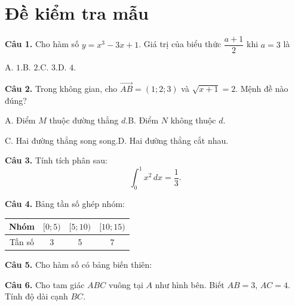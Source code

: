 \documentclass[12pt,a4paper]{article}
\newcommand{\vecto}[1]{\overrightarrow{#1}}
\begin{document}
\section*{Đề kiểm tra mẫu}

\textbf{Câu 1.} Cho hàm số $y=x^3-3x+1$. Giá trị của biểu thức $\dfrac{a+1}{2}$ khi $a=3$ là

\noindent A. $1$.\hfill B. $2$.\hfill C. $3$.\hfill D. $4$.

\textbf{Câu 2.} Trong không gian, cho $\vecto{AB}=(1;2;3)$ và $\sqrt{x+1}=2$. Mệnh đề nào đúng?

\noindent A. Điểm $M$ thuộc đường thẳng $d$.\hfill B. Điểm $N$ không thuộc $d$.

\noindent C. Hai đường thẳng song song.\hfill D. Hai đường thẳng cắt nhau.

\textbf{Câu 3.} Tính tích phân sau:
\begin{equation}
\int_0^1 x^2\,dx=\frac{1}{3}.
\end{equation}

\textbf{Câu 4.} Bảng tần số ghép nhóm:
\begin{center}
\begin{tabular}{|c|c|c|c|}
\hline
Nhóm & $[0;5)$ & $[5;10)$ & $[10;15)$ \\ \hline
Tần số & 3 & 5 & 7 \\ \hline
\end{tabular}
\end{center}

\textbf{Câu 5.} Cho hàm số có bảng biến thiên:
\begin{center}
\end{center}

\noindent\begin{minipage}{0.6\textwidth}
\textbf{Câu 6.} Cho tam giác $ABC$ vuông tại $A$ như hình bên. Biết $AB=3$, $AC=4$. Tính độ dài cạnh $BC$.
\end{minipage}\hfill
\begin{minipage}{0.35\textwidth}
\end{minipage}
\end{document}
